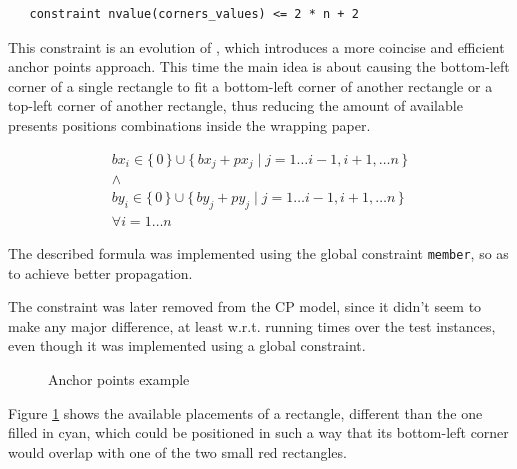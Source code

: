 \documentclass[a4paper,10pt]{article}
\newcounter{subsubsubsection}[subsubsection]
\begin{document}
\begin{verbatim}
   constraint nvalue(corners_values) <= 2 * n + 2
\end{verbatim}

 \label{sec:anchor-points-v2}
This constraint is an evolution of , which introduces a more coincise and efficient anchor points approach.
This time the main idea is about causing the bottom-left corner of a single rectangle to fit a bottom-left corner of another rectangle or a top-left corner of another rectangle, thus reducing the amount of available presents positions combinations inside the wrapping paper.

\begin{gather*}
   bx_{i} \in \{\,0\,\} \cup \{\, bx_{j} + px_{j} \mid j = 1 \dots i - 1, i + 1, \dots n \,\} \\
   \wedge \\
   by_{i} \in \{\,0\,\} \cup \{\, by_{j} + py_{j} \mid j = 1 \dots i - 1, i + 1, \dots n \,\} \\
   \forall{i = 1 \dots n}
\end{gather*}

The described formula was implemented using the global constraint \texttt{member}, so as to achieve better propagation. 

The constraint was later removed from the CP model, since it didn't seem to make any major difference, at least w.r.t. running times over the test instances, even though it was implemented using a global constraint.

\begin{figure}[h]
   \centering
   \caption{Anchor points example}
   \label{fig:anchor-points}
\end{figure}

Figure \ref{fig:anchor-points} shows the available placements of a rectangle, different than the one filled in cyan,
which could be positioned in such a way that its bottom-left corner would overlap with one of the two small red rectangles.
\end{document}
